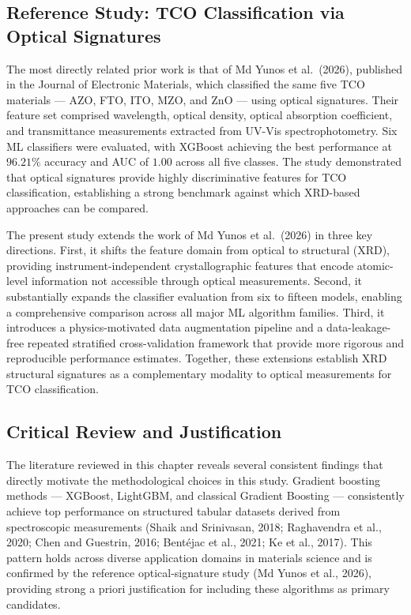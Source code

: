 \documentclass[12pt, oneside]{article} %
\begin{document}
\subsection{Reference Study: TCO Classification via Optical Signatures}

The most directly related prior work is that of Md Yunos et al.\ (2026), published in the Journal of Electronic Materials, which classified the same five TCO materials --- AZO, FTO, ITO, MZO, and ZnO --- using optical signatures. Their feature set comprised wavelength, optical density, optical absorption coefficient, and transmittance measurements extracted from UV-Vis spectrophotometry. Six ML classifiers were evaluated, with XGBoost achieving the best performance at $96.21\%$ accuracy and AUC of $1.00$ across all five classes. The study demonstrated that optical signatures provide highly discriminative features for TCO classification, establishing a strong benchmark against which XRD-based approaches can be compared.

The present study extends the work of Md Yunos et al.\ (2026) in three key directions. First, it shifts the feature domain from optical to structural (XRD), providing instrument-independent crystallographic features that encode atomic-level information not accessible through optical measurements. Second, it substantially expands the classifier evaluation from six to fifteen models, enabling a comprehensive comparison across all major ML algorithm families. Third, it introduces a physics-motivated data augmentation pipeline and a data-leakage-free repeated stratified cross-validation framework that provide more rigorous and reproducible performance estimates. Together, these extensions establish XRD structural signatures as a complementary modality to optical measurements for TCO classification.


\subsection{Critical Review and Justification}

The literature reviewed in this chapter reveals several consistent findings that directly motivate the methodological choices in this study. Gradient boosting methods --- XGBoost, LightGBM, and classical Gradient Boosting --- consistently achieve top performance on structured tabular datasets derived from spectroscopic measurements (Shaik and Srinivasan, 2018; Raghavendra et al., 2020; Chen and Guestrin, 2016; Bent\'{e}jac et al., 2021; Ke et al., 2017). This pattern holds across diverse application domains in materials science and is confirmed by the reference optical-signature study (Md Yunos et al., 2026), providing strong a priori justification for including these algorithms as primary candidates.
\end{document}
